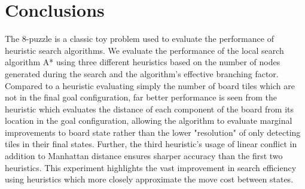 
\section{Conclusions}
\label{sec:concl}

The 8-puzzle is a classic toy problem used to evaluate the performance of heuristic search algorithms.  We evaluate the performance of the local search algorithm A* using three different heuristics based on the number of nodes generated during the search and the algorithm's effective branching factor.  Compared to a heuristic evaluating simply the number of board tiles which are not in the final goal configuration, far better performance is seen from the heuristic which evaluates the distance of each component of the board from its location in the goal configuration, allowing the algorithm to evaluate marginal improvements to board state rather than the lower "resolution" of only detecting tiles in their final states.  Further, the third heuristic's usage of linear conflict in addition to Manhattan distance ensures sharper accuracy than the first two heuristics. This experiment highlights the vast improvement in search efficiency using heuristics which more closely approximate the move cost between states.

